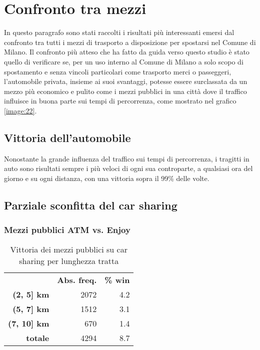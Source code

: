\section{Confronto tra mezzi}

In questo paragrafo sono stati raccolti i risultati più interessanti emersi dal confronto tra tutti i mezzi di trasporto a disposizione per spostarsi nel Comune di Milano. Il confronto più atteso che ha fatto da guida verso questo studio è stato quello di verificare se, per un uso interno al Comune di Milano a solo scopo di spostamento e senza vincoli particolari come trasporto merci o passeggeri, l'automobile privata, insieme ai suoi svantaggi, potesse essere surclassata da un mezzo più economico e pulito come i mezzi pubblici in una città dove il traffico influisce in buona parte sui tempi di percorrenza, come mostrato nel grafico \ref{image:22}.

\subsection{Vittoria dell'automobile}

Nonostante la grande influenza del traffico sui tempi di percorrenza, i tragitti in auto sono risultati sempre i più veloci di ogni sua controparte, a qualsiasi ora del giorno e su ogni distanza, con una vittoria sopra il 99\% delle volte.

\subsection{Parziale sconfitta del car sharing}

\subsubsection{Mezzi pubblici ATM vs. Enjoy}

\begin{table}[H]
\centering
\begin{tabular}{ | r r r | }
\hline
& \textbf{Abs. freq.} & \textbf{\% win} \\
\textbf{(2, 5] km} & 2072 & 4.2 \\
\textbf{(5, 7] km} & 1512 & 3.1 \\
\textbf{(7, 10] km} & 670 & 1.4 \\
\hline
\textbf{totale} & 4294 & 8.7 \\
\hline
\end{tabular}
\caption{Vittoria dei mezzi pubblici su car sharing per lunghezza tratta}
\label{table:5}
\end{table}

